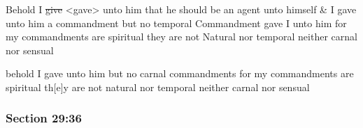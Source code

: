 		\begin{framed}
		\scriptsize
			\begin{compactdesc}
				\item[JSP] Behold I \sout{give} <gave> unto him that he should be an agent unto himself \& I gave unto him a commandment but no temporal Commandment gave I unto him for my commandments are spiritual they are not Natural nor temporal neither carnal nor sensual
				\item[HSN] behold I gave unto him but no carnal commandments for my commandments are spiritual th[e]y are not natural nor temporal neither carnal nor sensual
			\end{compactdesc}
		\end{framed}

	\subsubsection{Section 29:36} %
		\label{DC29-36}

